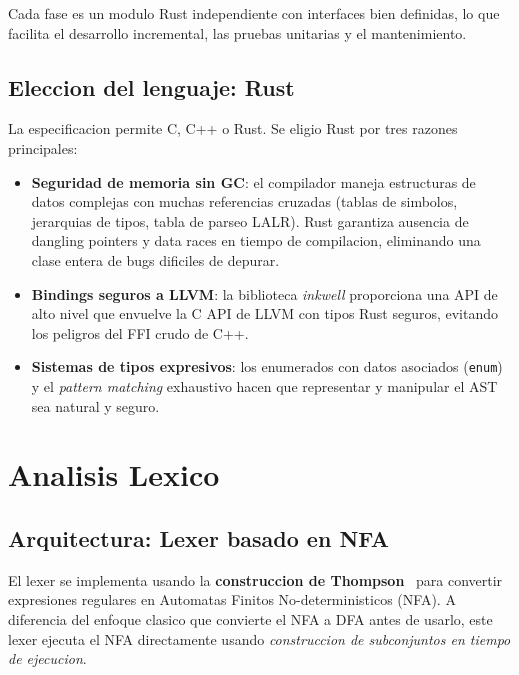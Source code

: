 \documentclass[12pt,a4paper]{article}
\begin{document}
Cada fase es un modulo Rust independiente con interfaces bien definidas, lo que
facilita el desarrollo incremental, las pruebas unitarias y el mantenimiento.

\subsection{Eleccion del lenguaje: Rust}

La especificacion permite C, C++ o Rust. Se eligio Rust por tres razones principales:

\begin{itemize}
  \item \textbf{Seguridad de memoria sin GC}: el compilador maneja estructuras de datos
    complejas con muchas referencias cruzadas (tablas de simbolos, jerarquias de tipos,
    tabla de parseo LALR). Rust garantiza ausencia de dangling pointers y data races en
    tiempo de compilacion, eliminando una clase entera de bugs dificiles de depurar.
  \item \textbf{Bindings seguros a LLVM}: la biblioteca \textit{inkwell} proporciona una
    API de alto nivel que envuelve la C API de LLVM con tipos Rust seguros, evitando
    los peligros del FFI crudo de C++.
  \item \textbf{Sistemas de tipos expresivos}: los enumerados con datos asociados
    (\texttt{enum}) y el \textit{pattern matching} exhaustivo hacen que representar y
    manipular el AST sea natural y seguro.
\end{itemize}

\section{Analisis Lexico}

\subsection{Arquitectura: Lexer basado en NFA}

El lexer se implementa usando la \textbf{construccion de Thompson}~\cite{thompson1968} para
convertir expresiones regulares en Automatas Finitos No-deterministicos (NFA). A diferencia
del enfoque clasico que convierte el NFA a DFA antes de usarlo, este lexer ejecuta el NFA
directamente usando \textit{construccion de subconjuntos en tiempo de ejecucion}.
\end{document}
